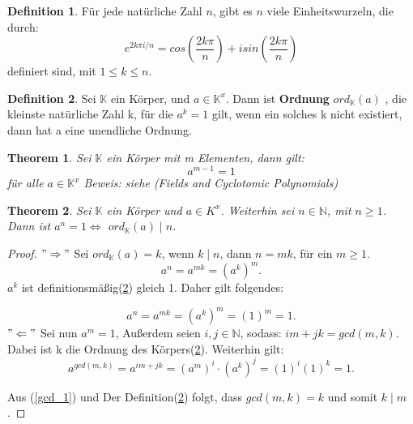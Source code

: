 \documentclass[12pt,oneside]{article}
\newtheorem{theorem}{Theorem}[section]
\theoremstyle{remark}
\theoremstyle{definition}
\newtheorem{definition}{Definition}[section]
\begin{document}
\smallskip

\begin{definition}
Für jede natürliche Zahl $n$, gibt es $n$ viele Einheitswurzeln, die durch:\newline
\begin{equation}
    e^{2k\pi i/n} = cos(\frac{2k \pi }{n}) + i sin(\frac{2k \pi}{n})
\end{equation}
definiert sind, mit $1 \leq k \leq n$.
\end{definition}

\smallskip

\begin{definition}\label{ord_def}
Sei $\mathbb{K}$ ein Körper, und $a \in \mathbb{K}^x$. Dann ist \textbf{Ordnung} $ ord_{ \mathbb{K} }(a)$ , die kleinste natürliche Zahl k, für die $a^k = 1 $ gilt, wenn ein solches k nicht existiert, dann hat a eine unendliche Ordnung. 
\end{definition}

\smallskip

\begin{theorem}
Sei $\mathbb{K}$ ein Körper mit m Elementen, dann gilt:
\begin{equation}
    a^{m-1} = 1
\end{equation}
für alle $a \in \mathbb{K}^x$\newline
Beweis: siehe (Fields and Cyclotomic Polynomials) 
\end{theorem}

\smallskip

\begin{theorem}
Sei $\mathbb{K}$ ein Körper und $a \in K^x$. Weiterhin sei $ n \in \mathbb{N}$, mit $n \geq 1$. Dann ist $a^n = 1 \Leftrightarrow	 $ $ord_{\mathbb{K}}(a) \mid n$. 
\end{theorem}

\smallskip

\begin{proof}
$"\Rightarrow"$\newline
Sei $ord_{\mathbb{K}}(a) = k $, wenn $k \mid n$, dann $n = mk$, für ein $ m \geq 1$.
\begin{equation}
    a^n = a^{mk} = (a^k)^m. 
\end{equation}
$a^k$ ist definitionsmäßig(\ref{ord_def}) gleich 1. Daher gilt folgendes:

\begin{equation}
    a^n = a^{mk} = (a^k)^m = (1)^m = 1.
\end{equation}
$"\Leftarrow"$\newline
Sei nun $a^m = 1$, Außerdem seien $i,j \in \mathbb{N}$, sodass:\newline
$im + jk = gcd(m,k)$. Dabei ist k die Ordnung des Körpers(\ref{ord_def}).\newline\newline
Weiterhin gilt: 
\begin{equation}\label{gcd_1}
   a^{gcd(m,k)} = a^{im + jk} = (a^m)^i \cdot (a^k)^j = (1)^i (1)^k = 1.
\end{equation}

Aus (\ref{gcd_1}) und Der Definition(\ref{ord_def}) folgt, dass $gcd(m,k) = k$ und somit $k \mid m$.
\end{proof}
\end{document}
